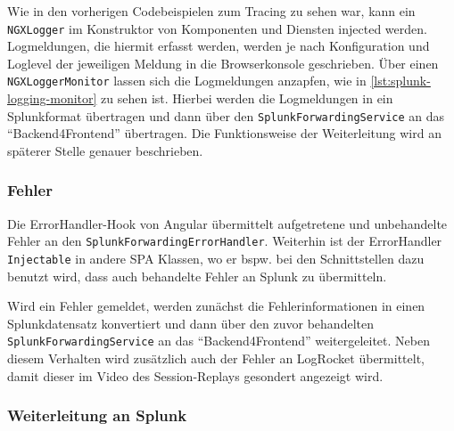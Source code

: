 Wie in den vorherigen Codebeispielen zum Tracing zu sehen war, kann ein \texttt{NGXLogger} im Konstruktor von Komponenten und Diensten injected werden. Logmeldungen, die hiermit erfasst werden, werden je nach Konfiguration und Loglevel der jeweiligen Meldung in die Browserkonsole geschrieben. Über einen \texttt{NGXLoggerMonitor} lassen sich die Logmeldungen anzapfen, wie in \autoref{lst:splunk-logging-monitor} zu sehen ist. Hierbei werden die Logmeldungen in ein Splunkformat übertragen und dann über den \texttt{SplunkForwardingService} an das \enquote{Backend4Frontend} übertragen. Die Funktionsweise der Weiterleitung wird an späterer Stelle genauer beschrieben.



\subsubsection{Fehler}

Die ErrorHandler-Hook von Angular übermittelt aufgetretene und unbehandelte Fehler an den \texttt{SplunkForwardingErrorHandler}. Weiterhin ist der ErrorHandler \texttt{Injectable} in andere SPA Klassen, wo er bspw. bei den Schnittstellen dazu benutzt wird, dass auch behandelte Fehler an Splunk zu übermitteln.

Wird ein Fehler gemeldet, werden zunächst die Fehlerinformationen in einen Splunkdatensatz konvertiert und dann über den zuvor behandelten \texttt{SplunkForwardingService} an das \enquote{Backend4Frontend} weitergeleitet. Neben diesem Verhalten wird zusätzlich auch der Fehler an LogRocket übermittelt, damit dieser im Video des Session-Replays gesondert angezeigt wird.



\subsubsection{Weiterleitung an Splunk}

